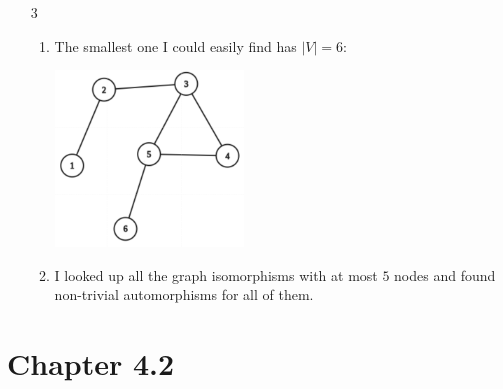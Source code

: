 \documentclass[12pt]{article}
\begin{document}
\begin{enumerate}
\begin{enumerate}
\begin{center}
                        \end{center}
            \end{enumerate}
      \item[3] \begin{enumerate}
                  \item The smallest one I could easily find has $|V|=6$:
                        \begin{center}
                              \includegraphics[width=5cm]{img/hw1/asymmetric}
                        \end{center}
                  \item I looked up all the graph isomorphisms with at most $5$ nodes
                        and found non-trivial automorphisms for all of them.
            \end{enumerate}
\end{enumerate}

\section{Chapter 4.2}
\end{document}
